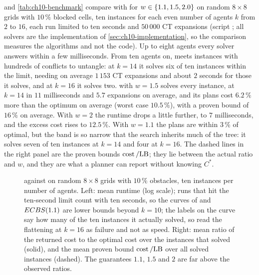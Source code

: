  and \cref{tab:ch10-benchmark} compare \cbs with
\ecbs for $w \in \left\{ 1.1, 1.5, 2.0 \right\}$ on random $8 \times 8$ grids with
$10\,\%$ blocked cells, ten instances for each even number of agents $k$ from
$2$ to $16$, each run limited to ten seconds and $50\,000$ CT expansions (script
; all solvers are the implementation of
\cref{sec:ch10-implementation}, so the comparison measures the algorithms
and not the code). Up to eight agents every solver answers within a few
milliseconds. From ten agents on, \cbs meets instances with hundreds of
conflicts to untangle: at $k = 14$ it solves six of ten instances within the
limit, needing on average $1\,153$ CT expansions and about $2$ seconds for
those it solves, and at $k = 16$ it solves two. \ecbs with $w = 1.5$ solves
every instance, at $k = 14$ in $11$ milliseconds and $5.7$ expansions on
average, and its plans cost $6.2\,\%$ more than the optimum on average (worst
case $10.5\,\%$), with a proven bound of $16\,\%$ on average. With $w = 2$
the runtime drops a little further, to $7$ milliseconds, and the excess cost
rises to $12.5\,\%$. With $w = 1.1$ the plans are within $3\,\%$ of
optimal, but the band is so narrow that the search inherits much of the \cbs
tree: it solves seven of ten instances at $k = 14$ and four at $k = 16$. The
dashed lines in the right panel are the proven bounds $\operatorname{cost}/\mathrm{LB}$;
they lie between the actual ratio and $w$, and they are what a planner can
report without knowing $C^*$.

\begin{figure}[tb]
  \centering
  \caption{\cbs against \ecbs on random $8 \times 8$ grids with $10\,\%$
  obstacles, ten instances per number of agents. Left: mean runtime (log
  scale); runs that hit the ten-second limit count with ten seconds, so the
  curves of \cbs and $ECBS(1.1)$ are lower bounds beyond $k = 10$; the labels
  on the \cbs curve say how many of the ten instances it actually solved, so
  read the flattening at $k = 16$ as failure and not as speed. Right:
  mean ratio of the returned cost to the optimal cost over the instances that
  \cbs solved (solid), and the mean proven bound $\operatorname{cost}/\mathrm{LB}$ over all
  solved instances (dashed). The guarantees $1.1$, $1.5$ and $2$ are far above
  the observed ratios.}
  \label{fig:ch10-benchmark}
\end{figure}

